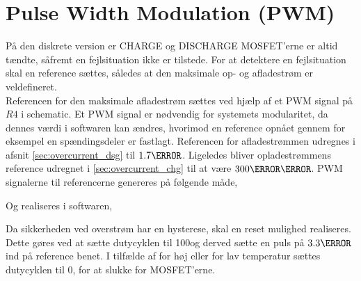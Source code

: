 \section{Pulse Width Modulation (PWM)}
På den diskrete version er CHARGE og DISCHARGE MOSFET'erne er altid tændte, såfremt en fejlsituation ikke er tilstede. For at detektere en fejlsituation skal en reference sættes, således at den maksimale op- og afladestrøm er veldefineret.
\\

Referencen for den maksimale afladestrøm sættes ved hjælp af et PWM signal på $R4$ i schematic. Et PWM signal er nødvendig for systemets modularitet, da dennes værdi i softwaren kan ændres, hvorimod en reference opnået gennem for eksempel en spændingsdeler er fastlagt. Referencen for afladestrømmen udregnes i afsnit \ref{sec:overcurrent_dsg} til $1.7\volt$. Ligeledes bliver opladestrømmens reference udregnet i \ref{sec:overcurrent_chg} til at være $300\milli\volt$. PWM signalerne til referencerne genereres på følgende måde,


Og realiseres i softwaren,


Da sikkerheden ved overstrøm har en hysterese, skal en reset mulighed realiseres. Dette gøres ved at sætte dutycyklen til 100\percent\space og derved sætte en puls på $3.3\volt$ ind på reference benet. I tilfælde af for høj eller for lav temperatur sættes dutycyklen til 0\percent, for at slukke for MOSFET'erne.

